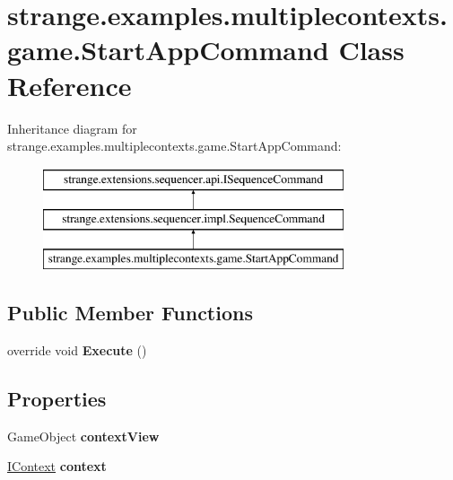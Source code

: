 \hypertarget{classstrange_1_1examples_1_1multiplecontexts_1_1game_1_1_start_app_command}{\section{strange.\-examples.\-multiplecontexts.\-game.\-Start\-App\-Command Class Reference}
\label{classstrange_1_1examples_1_1multiplecontexts_1_1game_1_1_start_app_command}
}
Inheritance diagram for strange.\-examples.\-multiplecontexts.\-game.\-Start\-App\-Command\-:\begin{figure}[H]
\begin{center}
\leavevmode
\includegraphics[height=3.000000cm]{classstrange_1_1examples_1_1multiplecontexts_1_1game_1_1_start_app_command}
\end{center}
\end{figure}
\subsection*{Public Member Functions}
\begin{DoxyCompactItemize}
\item 
\hypertarget{classstrange_1_1examples_1_1multiplecontexts_1_1game_1_1_start_app_command_aa3a9b93319478c3d8ef4c278649f875c}{override void {\bfseries Execute} ()}\label{classstrange_1_1examples_1_1multiplecontexts_1_1game_1_1_start_app_command_aa3a9b93319478c3d8ef4c278649f875c}

\end{DoxyCompactItemize}
\subsection*{Properties}
\begin{DoxyCompactItemize}
\item 
\hypertarget{classstrange_1_1examples_1_1multiplecontexts_1_1game_1_1_start_app_command_a804f1115ecf19489e3cfcc0148800bff}{Game\-Object {\bfseries context\-View}}\label{classstrange_1_1examples_1_1multiplecontexts_1_1game_1_1_start_app_command_a804f1115ecf19489e3cfcc0148800bff}

\item 
\hypertarget{classstrange_1_1examples_1_1multiplecontexts_1_1game_1_1_start_app_command_a76c12be26c61fab4f3e24f03a43573bd}{\hyperlink{interfacestrange_1_1extensions_1_1context_1_1api_1_1_i_context}{I\-Context} {\bfseries context}}\label{classstrange_1_1examples_1_1multiplecontexts_1_1game_1_1_start_app_command_a76c12be26c61fab4f3e24f03a43573bd}

\end{DoxyCompactItemize}


